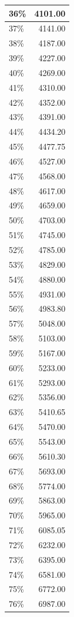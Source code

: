 \documentclass[
]{book}
\begin{document}
\begin{table}
\begin{tabular}[t]{l|r}
\hline
36\% & 4101.00\\
\hline
37\% & 4141.00\\
\hline
38\% & 4187.00\\
\hline
39\% & 4227.00\\
\hline
40\% & 4269.00\\
\hline
41\% & 4310.00\\
\hline
42\% & 4352.00\\
\hline
43\% & 4391.00\\
\hline
44\% & 4434.20\\
\hline
45\% & 4477.75\\
\hline
46\% & 4527.00\\
\hline
47\% & 4568.00\\
\hline
48\% & 4617.00\\
\hline
49\% & 4659.00\\
\hline
50\% & 4703.00\\
\hline
51\% & 4745.00\\
\hline
52\% & 4785.00\\
\hline
53\% & 4829.00\\
\hline
54\% & 4880.00\\
\hline
55\% & 4931.00\\
\hline
56\% & 4983.80\\
\hline
57\% & 5048.00\\
\hline
58\% & 5103.00\\
\hline
59\% & 5167.00\\
\hline
60\% & 5233.00\\
\hline
61\% & 5293.00\\
\hline
62\% & 5356.00\\
\hline
63\% & 5410.65\\
\hline
64\% & 5470.00\\
\hline
65\% & 5543.00\\
\hline
66\% & 5610.30\\
\hline
67\% & 5693.00\\
\hline
68\% & 5774.00\\
\hline
69\% & 5863.00\\
\hline
70\% & 5965.00\\
\hline
71\% & 6085.05\\
\hline
72\% & 6232.00\\
\hline
73\% & 6395.00\\
\hline
74\% & 6581.00\\
\hline
75\% & 6772.00\\
\hline
76\% & 6987.00\\

\end{tabular}
\end{table}
\end{document}
